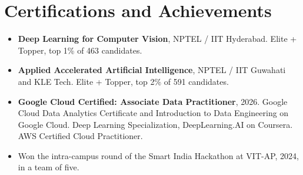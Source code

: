 \documentclass[a4paper,9pt]{extarticle}
\begin{document}
\section*{Certifications and Achievements}
\begin{itemize}
  \item \textbf{Deep Learning for Computer Vision}, NPTEL / IIT Hyderabad. Elite + Topper, top 1\% of 463 candidates.
  \item \textbf{Applied Accelerated Artificial Intelligence}, NPTEL / IIT Guwahati and KLE Tech. Elite + Topper, top 2\% of 591 candidates.
  \item \textbf{Google Cloud Certified: Associate Data Practitioner}, 2026. Google Cloud Data Analytics Certificate and Introduction to Data Engineering on Google Cloud. Deep Learning Specialization, DeepLearning.AI on Coursera. AWS Certified Cloud Practitioner.
  \item Won the intra-campus round of the Smart India Hackathon at VIT-AP, 2024, in a team of five.
\end{itemize}
\end{document}
